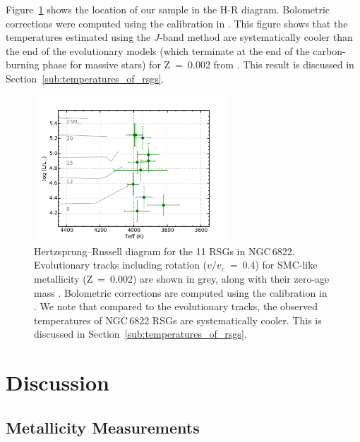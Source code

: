 Figure~\ref{fig:6822HRD} shows the location of our sample in the H-R diagram.
Bolometric corrections were computed using the calibration in
\cite{2013ApJ...767....3D}.
This figure shows that the temperatures estimated using the $J$-band method are systematically cooler than the end of the evolutionary models (which terminate at the end of the carbon-burning phase for massive stars) for
Z~=~0.002 from
\cite{2013A&A...558A.103G}.
This result is discussed in Section~\ref{sub:temperatures_of_rsgs}.


\begin{figure}
 \centering
\includegraphics[width=0.65\textwidth]{ngc6822/N6822_HRD_thesis}
\caption[NGC\,6822 Hertzsprung--Russell diagram for RSGs]{
Hertzsprung--Russell diagram for the 11 RSGs in NGC\,6822.
Evolutionary tracks including rotation
($v/v_{c}$~=~0.4) for SMC-like metallicity (Z~=~0.002)
are shown in grey, along with their zero-age mass
\protect\citep{2013A&A...558A.103G}.
Bolometric corrections are computed using the calibration in
\protect\cite{2013ApJ...767....3D}.
We note that compared to the evolutionary tracks,
the observed temperatures of NGC\,6822 RSGs are systematically cooler.
This is discussed in Section~\ref{sub:temperatures_of_rsgs}.
}
\label{fig:6822HRD}
\end{figure}



\section{Discussion} %
\label{sec:ngc6822disc}

\subsection{Metallicity Measurements} %
\label{sub:metallicity_measurements}

